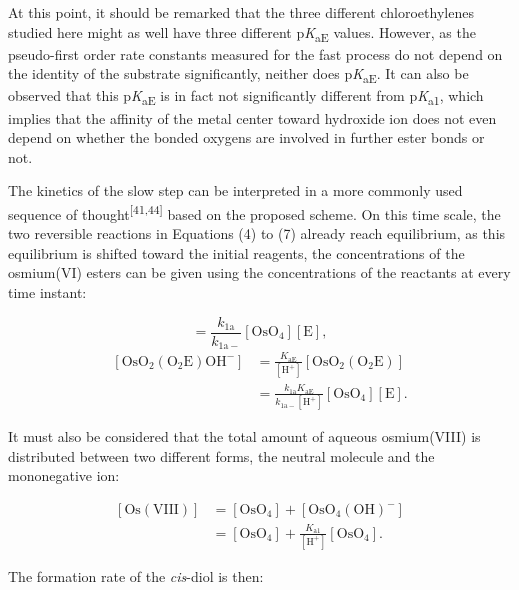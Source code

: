 \documentclass{article}
\begin{document}
At this point, it should be remarked that the three different chloroethylenes studied here might as well have three different p\emph{K}\textsubscript{aE} values. However, as the pseudo-first order rate constants measured for the fast process do not depend on the identity of the substrate significantly, neither does p\emph{K}\textsubscript{aE}. It can also be observed that this p\emph{K}\textsubscript{aE} is in fact not significantly different from p\emph{K}\textsubscript{a1}, which implies that the affinity of the metal center toward hydroxide ion does not even depend on whether the bonded oxygens are involved in further ester bonds or not.

The kinetics of the slow step can be interpreted in a more commonly used sequence of thought\textsuperscript{[41,44]} based on the proposed scheme. On this time scale, the two reversible reactions in Equations (4) to (7) already reach equilibrium, as this equilibrium is shifted toward the initial reagents, the concentrations of the osmium(VI) esters can be given using the concentrations of the reactants at every time instant:

\begin{equation}
[\mathrm{OsO_2(O_2E)}] = \frac{k_{\mathrm{1a}}}{k_{\mathrm{1a-}}}[\mathrm{OsO_4}][\mathrm{E}], \tag{15}
\end{equation}
\begin{equation}
\begin{split}
[\mathrm{OsO_2(O_2E)OH^-}] &= \frac{K_{\mathrm{aE}}}{[\mathrm{H}^+]}[\mathrm{OsO_2(O_2E)}]\\
&= \frac{k_{\mathrm{1a}}K_{\mathrm{aE}}}{k_{\mathrm{1a-}}[\mathrm{H}^+]}[\mathrm{OsO_4}][\mathrm{E}].
\end{split} \tag{16}
\end{equation}

It must also be considered that the total amount of aqueous osmium(VIII) is distributed between two different forms, the neutral molecule and the mononegative ion:

\begin{equation}
\begin{split}
[\mathrm{Os(VIII)}] &= [\mathrm{OsO_4}] + [\mathrm{OsO_4(OH)^-}]\\
&= [\mathrm{OsO_4}] + \frac{K_{\mathrm{a1}}}{[\mathrm{H}^+]}[\mathrm{OsO_4}].
\end{split} \tag{17}
\end{equation}

The formation rate of the \emph{cis}-diol is then:
\end{document}
